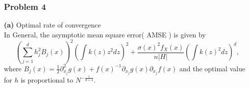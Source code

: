 \documentclass[10]{beamer}
\begin{document}
\begin{frame}
\frametitle{Problem 4}
\textbf{(a)} Optimal rate of convergence\\
In General, the asymptotic mean square error( AMSE ) is given by
\begin{equation*}
\left( \sum_{j=1}^{d} h_{j}^{2} B_{j}(x) \right)^{2} \left( \int k(z) z^{2} dz \right)^{2} +  \frac{ \sigma(x)^{2} f_{X}(x)}{n|H|}  \left( \int k(z)^2 dz \right)^{d},
\end{equation*}
where $B_{j}(x) = \frac{1}{2} \partial^{2}_{x_j} g(x) + f(x)^{-1} \partial_{x_j} g(x) \partial_{x_j}f(x)$ 
and the optimal value for $h$ is proportional to $N^{-\frac{1}{d+4}}$.
\end{frame}


% 
% 
\end{document}
